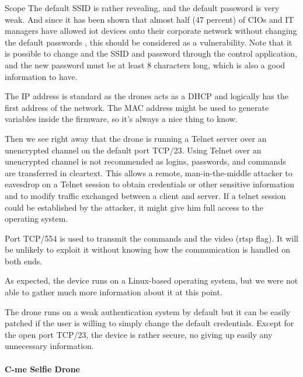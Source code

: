 \begin{chaptercover}{Scope}
The default SSID is rather revealing, and the default password is very weak. And since it has been shown that almost half (47 percent) of CIOs and IT managers have allowed \acrshort{iot} devices onto their corporate network without changing the default passwords \cite{iot-security-default-passwords}, this should be considered as a vulnerability. Note that it is possible to change and the SSID and password through the control application, and the new password must be at least 8 characters long, which is also a good information to have.

The IP address is standard as the drones acts as a DHCP and logically has the first address of the network. The MAC address might be used to generate variables inside the firmware, so it’s always a nice thing to know.

Then we see right away that the drone is running a Telnet server over an unencrypted channel on the default port TCP/23. Using Telnet over an unencrypted channel is not recommended as logins, passwords, and commands are transferred in cleartext. This allows a remote, man-in-the-middle attacker to eavesdrop on a Telnet session to obtain credentials or other sensitive information and to modify traffic exchanged between a client and server. If a telnet session could be established by the attacker, it might give him full access to the operating system.

Port TCP/554 is used to transmit the commands and the video (rtsp flag). It will be unlikely to exploit it without knowing how the communication is handled on both ends.

As expected, the device runs on a Linux-based operating system, but we were not able to gather much more information about it at this point.

\begin{tip}
The drone runs on a weak authentication system by default but it can be easily patched if the user is willing to simply change the default credentials.
Except for the open port TCP/23, the device is rather secure, no giving up easily any unnecessary information.
\end{tip}

\paragraph{C-me Selfie Drone}


\end{chaptercover}
